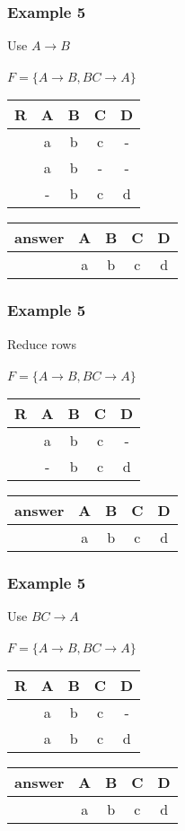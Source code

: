 \documentclass{beamer}
\begin{document}
\begin{frame}
  \frametitle{Example 5}
  Use $A \rightarrow B$\\
  \hfill \\
  $F = \{A \rightarrow B, BC \rightarrow A\}$\\
  \begin{tabular}{ c | c c c c}
  R & A & B & C & D\\
  \hline
  &a & b & c  & - \\
  &a & b & -  & - \\
  &- & b & c  & d \\
  \end{tabular}

  \begin{tabular}{ c | c c c c}
  answer & A & B & C & D\\
  \hline
  & a & b & c  & d \\
  \end{tabular}

\end{frame}

\begin{frame}
  \frametitle{Example 5}
  Reduce rows\\
  \hfill \\
  $F = \{A \rightarrow B, BC \rightarrow A\}$\\
  \begin{tabular}{ c | c c c c}
  R & A & B & C & D\\
  \hline
  &a & b & c  & - \\
  &- & b & c  & d \\
  \end{tabular}

  \begin{tabular}{ c | c c c c}
  answer & A & B & C & D\\
  \hline
  & a & b & c  & d \\
  \end{tabular}
\end{frame}

\begin{frame}
  \frametitle{Example 5}
  Use $BC \rightarrow A$\\
  \hfill \\
  $F = \{A \rightarrow B, BC \rightarrow A\}$\\
  \begin{tabular}{ c | c c c c}
  R & A & B & C & D\\
  \hline
  &a & b & c  & - \\
  &a & b & c  & d \\
  \end{tabular}

  \begin{tabular}{ c | c c c c}
  answer & A & B & C & D\\
  \hline
  & a & b & c  & d \\
  \end{tabular}
\end{frame}
\end{document}
